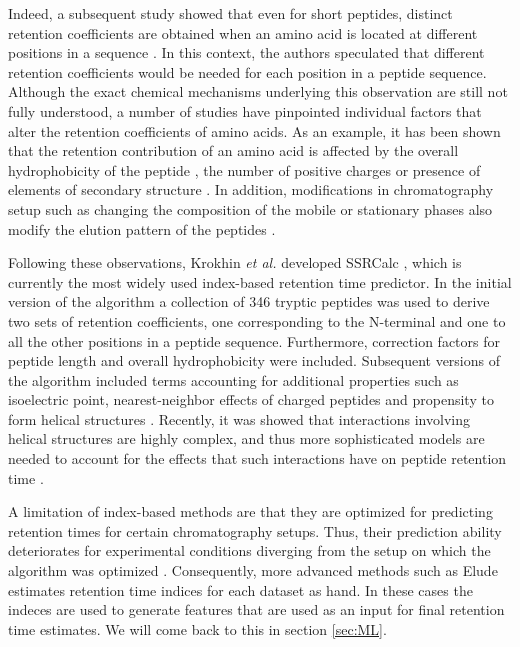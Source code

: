 \documentclass[a4paper]{article}
\begin{document}



Indeed, a subsequent study showed that even for short peptides,
distinct retention coefficients are obtained when an amino acid is
located at different positions in a sequence \cite{Houghten1987}. In
this context, the authors speculated that different retention
coefficients would be needed for each position in a peptide
sequence. Although the exact chemical mechanisms underlying this
observation are still not fully understood, a number of studies have
pinpointed individual factors that alter the retention coefficients of
amino acids. As an example, it has been shown that the retention
contribution of an amino acid is affected by the overall
hydrophobicity of the peptide \cite{Mant2006}, the number of positive
charges \cite{Mant2006} or presence of elements of secondary
structure \cite{Zhou1990}. In addition, modifications in
chromatography setup such as changing the composition of the mobile or
stationary phases also modify the elution pattern of the
peptides \cite{Browne1982, Guo1987, Gilar2010}.


Following these observations, Krokhin {\em et al.} developed SSRCalc
\cite{Krokhin2004}, which is currently the most widely used
index-based retention time predictor. In the initial version of the
algorithm a collection of 346 tryptic peptides was used to derive two
sets of retention coefficients, one corresponding to the N-terminal
and one to all the other positions in a peptide sequence. Furthermore,
correction factors for peptide length and overall hydrophobicity were
included. Subsequent versions of the algorithm included terms
accounting for additional properties such as isoelectric point,
nearest-neighbor effects of charged peptides and propensity to form
helical structures \cite{Krokhin2006}. Recently, it was showed that
interactions involving helical structures are highly complex, and thus
more sophisticated models are needed to account for the effects that
such interactions have on peptide retention time \cite{ah}.

A limitation of index-based methods are that they are optimized for
predicting retention times for certain chromatography setups. Thus,
their prediction ability deteriorates for experimental conditions
diverging from the setup on which the algorithm was optimized
\cite{Spicer2007}. Consequently, more advanced methods such as {\sc
Elude} \cite{elude1,elude2} estimates retention time indices for each
dataset as hand. In these cases the indeces are used to generate
features that are used as an input for final retention time
estimates. We will come back to this in section \ref{sec:ML}. 
\end{document}
